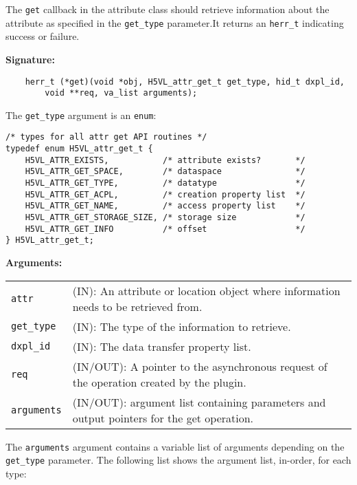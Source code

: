 The {\tt get} callback in the attribute class should retrieve
information about the attribute as specified in the {\tt get\_type}
parameter.It returns an {\tt herr\_t} indicating success or failure.

\textbf{Signature:}
\begin{lstlisting}
    herr_t (*get)(void *obj, H5VL_attr_get_t get_type, hid_t dxpl_id, 
        void **req, va_list arguments);
\end{lstlisting}

The {\tt get\_type} argument is an {\tt enum}:
\begin{lstlisting}
/* types for all attr get API routines */
typedef enum H5VL_attr_get_t {
    H5VL_ATTR_EXISTS,           /* attribute exists?       */
    H5VL_ATTR_GET_SPACE,        /* dataspace               */
    H5VL_ATTR_GET_TYPE,         /* datatype                */
    H5VL_ATTR_GET_ACPL,         /* creation property list  */
    H5VL_ATTR_GET_NAME,         /* access property list    */
    H5VL_ATTR_GET_STORAGE_SIZE, /* storage size            */
    H5VL_ATTR_GET_INFO          /* offset                  */
} H5VL_attr_get_t;
\end{lstlisting}

\textbf{Arguments:}\\
\begin{tabular}{l p{10cm}}
  {\tt attr} & (IN): An attribute or location object where information
  needs to be retrieved from.\\
  {\tt get\_type} & (IN): The type of the information to retrieve.\\
  {\tt dxpl\_id} & (IN): The data transfer property list.\\
  {\tt req} & (IN/OUT): A pointer to the asynchronous request of the
  operation created by the plugin.\\
  {\tt arguments} & (IN/OUT): argument list containing parameters and
  output pointers for the get operation. \\
\end{tabular}

The {\tt arguments} argument contains a variable list of arguments
depending on the {\tt get\_type} parameter. The following list shows
the argument list, in-order, for each type:

